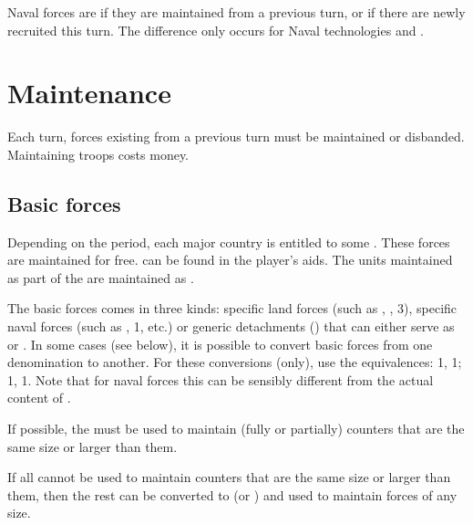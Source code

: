 \aparag[Navy] Naval forces are  if they are maintained from a
previous turn, or  if there are newly recruited this turn.
\bparag The difference only occurs for Naval technologies  and
.%





\section{Maintenance}\label{chLogistic:Maintenance}

\aparag Each turn, forces existing from a previous turn must be maintained or
disbanded. Maintaining troops costs money.



\subsection{Basic forces}

\aparag Depending on the period, each major country is entitled to some
. These forces are maintained for free.  can be found in the player's aids.
\bparag The units maintained as part of the  are
maintained as .

\aparag The basic forces comes in three kinds: specific land forces (such as
\ARMY\faceplus, \ARMY\facemoins, 3\LD), specific naval forces (such as
\FLEET\faceplus, 1\ND, etc.) or generic detachments (\GD) that can either
serve as \LD or \ND.
\bparag In some cases (see below), it is possible to convert basic forces from
one denomination to another. For these conversions (only), use the
equivalences: 1\ARMY{}\LD, 1\ARMY{}\ARMY{}\LD ;
1\FLEET{}\ND, 1\FLEET{}\FLEET{}\ND. Note that for
naval forces this can be sensibly different from the actual content of \FLEET.

\aparag If possible, the  must be used to maintain (fully
or partially) counters that are the same size or larger than them.

\aparag If all  cannot be used to maintain counters that
are the same size or larger than them, then the rest can be converted to \LD
(or \ND) and used to maintain forces of any size.


